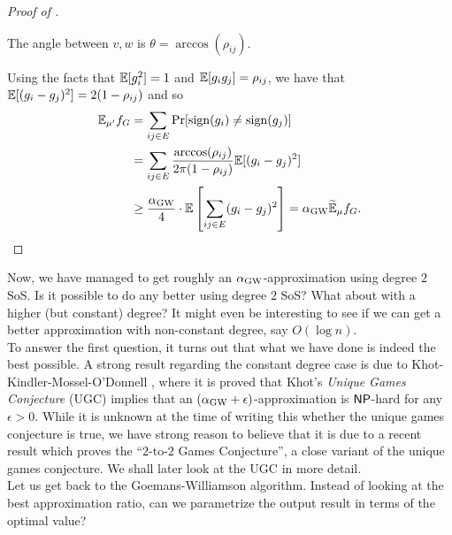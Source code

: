 \begin{proof}[Proof of ]
\begin{center}
		The angle between $v,w$ is $\theta = \arccos(\rho_{ij})$.%
		\end{center}

		Using the facts that $\mathbb{E}[g_i^2] = 1$ and $\mathbb{E}[g_ig_j] = \rho_{ij}$, we have that $\mathbb{E}[(g_i - g_j)^2] = 2(1-\rho_{ij})$ and so
		\begin{align*}
			\mathbb{E}_{\mu'} f_G &= \sum_{ij \in E} \Pr[\operatorname{sign}(g_i) \ne \operatorname{sign}(g_j)] \\
				&= \sum_{ij \in E} \frac{\arccos(\rho_{ij})}{2\pi(1-\rho_{ij})} \mathbb{E}[(g_i - g_j)^2] \\
				&\ge \frac{\alpha_{\text{GW}}}{4} \cdot \mathbb{E}\left[\sum_{ij \in E} (g_i - g_j)^2\right] = \alpha_{\text{GW}} \widetilde{\mathbb{E}}_{\mu} f_G. \qedhere
		\end{align*}
	\end{proof}

	Now, we have managed to get roughly an $\alpha_{\text{GW}}$-approximation using degree $2$ SoS. Is it possible to do any better using degree $2$ SoS? What about with a higher (but constant) degree? It might even be interesting to see if we can get a better approximation with non-constant degree, say $O(\log n)$.\\
	To answer the first question, it turns out that what we have done is indeed the best possible. A strong result regarding the constant degree case is due to Khot-Kindler-Mossel-O'Donnell \cite{max-cut-ugc}, where it is proved that Khot's \emph{Unique Games Conjecture} (UGC) \cite{ugc-og} implies that an $(\alpha_{\text{GW}}+\epsilon)$-approximation is $\mathsf{NP}$-hard for any $\epsilon > 0$. While it is unknown at the time of writing this whether the unique games conjecture is true, we have strong reason to believe that it is due to a recent result \cite{2-2-gc} which proves the ``$2$-to-$2$ Games Conjecture'', a close variant of the unique games conjecture. We shall later look at the UGC in more detail.\\

	Let us get back to the Goemans-Williamson algorithm. Instead of looking at the best approximation ratio, can we parametrize the output result in terms of the optimal value?

